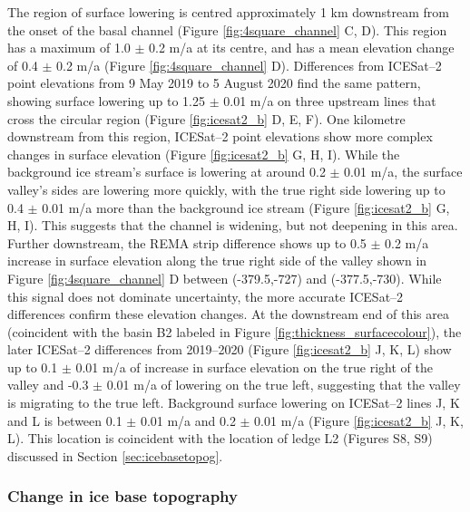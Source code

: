 \newpage
The region of surface lowering is centred  approximately 1 km downstream from the onset of the basal channel (Figure \ref{fig:4square_channel} C, D). This region has a maximum of 1.0 $\pm$ 0.2 m/a at its centre, and has a mean elevation change of 0.4 $\pm$ 0.2 m/a (Figure \ref{fig:4square_channel} D).  Differences from ICESat--2 point elevations from 9 May 2019 to 5 August 2020 find the same pattern, showing surface lowering up to 1.25 $\pm$ 0.01 m/a on three upstream lines that cross the circular region (Figure \ref{fig:icesat2_b} D, E, F). 
One kilometre downstream from this region, ICESat--2 point elevations show more complex changes in surface elevation (Figure \ref{fig:icesat2_b} G, H, I). While the background ice stream's surface is lowering at around 0.2 $\pm$ 0.01 m/a, the surface valley's sides are lowering more quickly, with the true right side  lowering up to 0.4 $\pm$ 0.01 m/a more than the background ice stream (Figure \ref{fig:icesat2_b} G, H, I).  This suggests that the channel is widening, but not deepening in this area.
Further downstream, the REMA strip difference shows up to 0.5 $\pm$ 0.2 m/a increase in surface elevation along the true right side of the valley shown in Figure \ref{fig:4square_channel} D between (-379.5,-727) and (-377.5,-730). While this signal does not dominate uncertainty, the more accurate ICESat--2 differences confirm these elevation changes.  At the downstream end of this area (coincident with the basin B2 labeled in Figure \ref{fig:thickness_surfacecolour}), the later ICESat--2 differences from 2019--2020 (Figure \ref{fig:icesat2_b} J, K, L) show up to 0.1 $\pm$ 0.01  m/a of increase in surface elevation on the true right of the valley and -0.3 $\pm$ 0.01 m/a of lowering on the true left, suggesting that the valley is migrating to the true left. Background surface lowering on ICESat--2 lines J, K and L is between 0.1 $\pm$ 0.01 m/a and 0.2 $\pm$ 0.01 m/a (Figure \ref{fig:icesat2_b} J, K, L). This location is coincident with the location of ledge L2 (Figures S8, S9) discussed in Section \ref{sec:icebasetopog}. 
 

\subsubsection{Change in ice base topography} \label{sec:changeinbase}

